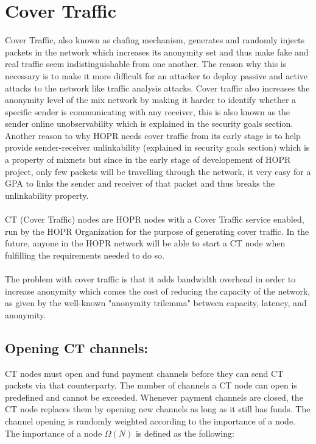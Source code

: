 \section{Cover Traffic}


Cover Traffic, also known as chafing mechanism, generates and randomly injects packets in the network which increases its anonymity set and thus make fake and real traffic seem indistinguishable from one another. The reason why this is necessary is to make it more difficult for an attacker to deploy passive and active attacks to the network like traffic analysis attacks.
Cover traffic also increases the anonymity level of the mix network by making it harder to identify whether a specific sender is communicating with any receiver, this is also known as the sender online unobservability which is explained in the security goals section.
Another reason to why HOPR needs cover traffic from its early stage is to help provide sender-receiver unlinkability (explained in security goals section) which is a property of mixnets but since in the early stage of developement of HOPR project, only few packets will be travelling through the network, it very easy for a GPA to links the sender and receiver of that packet and thus breaks the unlinkability property.
\\~\\ CT (Cover Traffic) nodes are HOPR nodes with a Cover Traffic service enabled, run by the HOPR Organization for the purpose of generating cover traffic. In the future, anyone in the HOPR network will be able to start a CT node when fulfilling the requirements needed to do so.
\\~\\The problem with cover traffic is that it adds bandwidth overhead in order to increase anonymity which comes the cost of reducing the capacity of the network, as given by the well-known "anonymity trilemma" between capacity, latency, and anonymity. 
\subsection{Opening CT channels:} 
CT nodes must open and fund payment channels before they can send CT packets via that counterparty. The number of channels a CT node can open is predefined and cannot be exceeded. Whenever payment channels are closed, the CT node replaces them by opening new channels as long as it still has funds. 
The channel opening is randomly weighted according to the importance of a node. The importance of a node $\Omega(N)$ is defined as the following:

